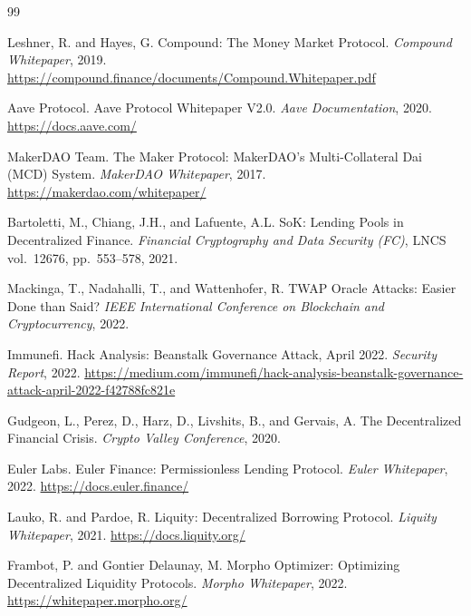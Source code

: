 \documentclass[10pt,a4paper,twocolumn]{article}
\theoremstyle{definition}
\theoremstyle{plain}
\theoremstyle{remark}
\begin{document}
\begin{thebibliography}{99}


Leshner, R. and Hayes, G.
\newblock Compound: The Money Market Protocol.
\newblock \emph{Compound Whitepaper}, 2019.
\newblock \url{https://compound.finance/documents/Compound.Whitepaper.pdf}

Aave Protocol.
\newblock Aave Protocol Whitepaper V2.0.
\newblock \emph{Aave Documentation}, 2020.
\newblock \url{https://docs.aave.com/}

MakerDAO Team.
\newblock The Maker Protocol: MakerDAO's Multi-Collateral Dai (MCD) System.
\newblock \emph{MakerDAO Whitepaper}, 2017.
\newblock \url{https://makerdao.com/whitepaper/}

Bartoletti, M., Chiang, J.H., and Lafuente, A.L.
\newblock SoK: Lending Pools in Decentralized Finance.
\newblock \emph{Financial Cryptography and Data Security (FC)}, LNCS vol.~12676, pp.~553--578, 2021.

Mackinga, T., Nadahalli, T., and Wattenhofer, R.
\newblock TWAP Oracle Attacks: Easier Done than Said?
\newblock \emph{IEEE International Conference on Blockchain and Cryptocurrency}, 2022.

Immunefi.
\newblock Hack Analysis: Beanstalk Governance Attack, April 2022.
\newblock \emph{Security Report}, 2022.
\newblock \url{https://medium.com/immunefi/hack-analysis-beanstalk-governance-attack-april-2022-f42788fc821e}

Gudgeon, L., Perez, D., Harz, D., Livshits, B., and Gervais, A.
\newblock The Decentralized Financial Crisis.
\newblock \emph{Crypto Valley Conference}, 2020.

Euler Labs.
\newblock Euler Finance: Permissionless Lending Protocol.
\newblock \emph{Euler Whitepaper}, 2022.
\newblock \url{https://docs.euler.finance/}

Lauko, R. and Pardoe, R.
\newblock Liquity: Decentralized Borrowing Protocol.
\newblock \emph{Liquity Whitepaper}, 2021.
\newblock \url{https://docs.liquity.org/}

Frambot, P. and Gontier Delaunay, M.
\newblock Morpho Optimizer: Optimizing Decentralized Liquidity Protocols.
\newblock \emph{Morpho Whitepaper}, 2022.
\newblock \url{https://whitepaper.morpho.org/}


\end{thebibliography}
\end{document}
